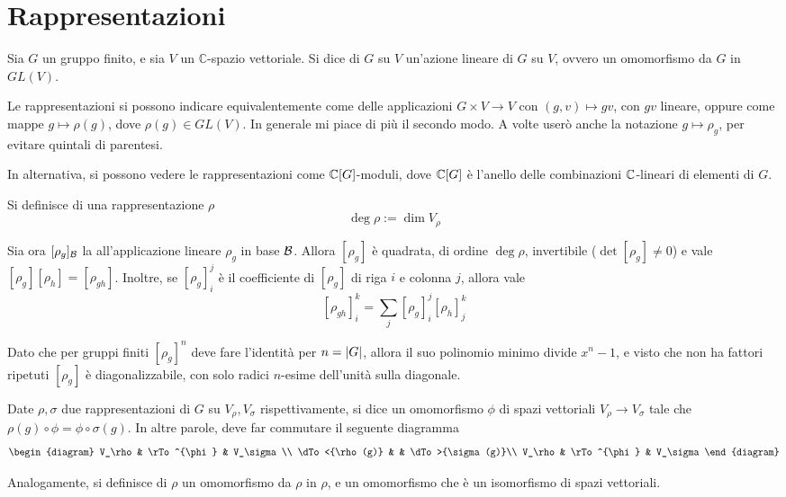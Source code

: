   \section{Rappresentazioni}
    \begin{mydef}
      Sia $G$ un gruppo finito, e sia $V$ un $\mathbb C$-spazio vettoriale. Si dice  di $G$ su $V$ un'azione lineare di $G$ su $V$, ovvero un omomorfismo da $G$ in $GL(V)$.
    \end{mydef}
    
    Le rappresentazioni si possono indicare equivalentemente come delle applicazioni $G \times V \rightarrow V$ con $(g,v)\mapsto gv$, con $gv$ lineare, oppure come mappe $g \mapsto \rho(g)$, dove $\rho(g) \in GL(V)$. In generale mi piace di più il secondo modo. A volte userò anche la notazione $g \mapsto \rho_g$, per evitare quintali di parentesi.
    
    In alternativa, si possono vedere le rappresentazioni come $\mathbb C[G]$-moduli, dove $\mathbb C[G]$ è l'anello delle combinazioni $\mathbb C$-lineari di elementi di $G$.
    
    \begin{mydef}
     Si definisce  di una rappresentazione $\rho$
     \[\deg \rho := \dim V_\rho\]
    \end{mydef}

    
    Sia ora $[\rho_g]_\mathcal B$ la  all'applicazione lineare $\rho_g$ in base $\mathcal B$. Allora $[\rho_g]$ è quadrata, di ordine $\deg \rho$, invertibile ($\det [\rho_g]\ne 0$) e vale $[\rho_g] [\rho_h]=[\rho_{gh}]$. Inoltre, se $[\rho_g]_i^j$ è il coefficiente di $[\rho_g]$ di riga $i$ e colonna $j$, allora vale
    \[
     [\rho_{gh}]_i^k=\sum_j [\rho_g]_i^j [\rho_h]_j^k
    \]

    Dato che per gruppi finiti $[\rho_g]^n$ deve fare l'identità per $n=\left|G\right|$, allora il suo polinomio minimo divide $x^n-1$, e visto che non ha fattori ripetuti $[\rho_g]$ è diagonalizzabile, con solo radici $n$-esime dell'unità sulla diagonale. 
    
    \begin{mydef}
      Date $\rho,\sigma$ due rappresentazioni di $G$ su $V_\rho,V_\sigma$ rispettivamente, si dice  un omomorfismo $\phi$ di spazi vettoriali $V_\rho \rightarrow V_\sigma$ tale che $\rho(g) \circ \phi = \phi \circ \sigma(g)$. 
      In altre parole, deve far commutare il seguente diagramma
      \[
       \begin{diagram}
	V_\rho         & \rTo^{\phi}  & V_\sigma\\
	\dTo<{\rho(g)} &           	 & \dTo>{\sigma(g)}\\
	V_\rho         & \rTo^{\phi}  & V_\sigma
       \end{diagram}
      \]
       
    Analogamente, si definisce  di $\rho$ un omomorfismo da $\rho$ in $\rho$, e  un omomorfismo che è un isomorfismo di spazi vettoriali.
    \end{mydef}
    
